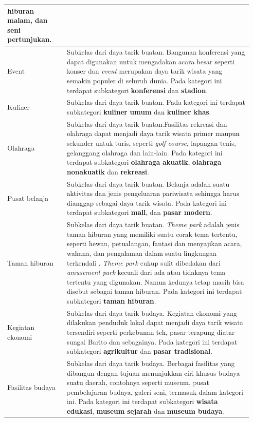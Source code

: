\begin{center}
\begin{longtable}{ |l|m{10cm}| }
	\textbf{hiburan malam}, dan \textbf{seni pertunjukan}. \\
	\hline
	Event & Subkelas dari daya tarik buatan. Bangunan konferensi yang dapat digunakan untuk mengadakan acara besar seperti konser dan \textit{event}
	merupakan daya tarik wisata yang semakin populer di seluruh dunia. Pada kategori ini terdapat subkategori \textbf{konferensi} dan \textbf{stadion}.\\
	\hline
	Kuliner & Subkelas dari daya tarik buatan. Pada kategori ini terdapat subkategori \textbf{kuliner umum} dan \textbf{kuliner khas}.\\
	\hline
	Olahraga & Subkelas dari daya tarik buatan.Fasilitas rekreasi dan olahraga dapat menjadi daya tarik wisata primer maupun sekunder untuk
	turis, seperti \textit{golf course}, lapangan tenis, gelanggang olahraga dan lain-lain.
	Pada kategori ini terdapat subkategori \textbf{olahraga akuatik}, \textbf{olahraga nonakuatik} dan \textbf{rekreasi}.\\
	\hline
	Pusat belanja & Subkelas dari daya tarik buatan. Belanja adalah suatu aktivitas dan jenis pengeluaran pariwisata sehingga harus dianggap sebagai daya tarik wisata.
	Pada kategori ini terdapat subkategori \textbf{mall}, dan \textbf{pasar modern}.\\
	\hline
	Taman hiburan & Subkelas dari daya tarik buatan. \textit{Theme park} adalah jenis taman hiburan yang memiliki suatu corak tema tertentu, seperti
	hewan, petualangan, fantasi dan menyajikan acara, wahana, dan pengalaman dalam suatu lingkungan terkendali \cite{inskeep1991tourism}.
	\textit{Theme park} cukup sulit dibedakan dari \textit{amusement park} kecuali dari ada atau tidaknya tema tertentu yang digunakan. Namun
	kedunya tetap masih bisa disebut sebagai taman hiburan.
	Pada kategori ini terdapat subkategori \textbf{taman hiburan}.\\
	\hline
	Kegiatan ekonomi & Subkelas dari daya tarik budaya. Kegiatan ekonomi yang dilakukan penduduk lokal dapat menjadi daya tarik wisata tersendiri seperti perkebunan teh, 
	pasar terapung diatar sungai Barito dan sebagainya.
	Pada kategori ini terdapat subkategori \textbf{agrikultur} dan \textbf{pasar tradisional}.\\
	\hline
	Fasilitas budaya & Subkelas dari daya tarik budaya. Berbagai fasilitas yang dibangun dengan tujuan menunjukkan ciri khusus budaya suatu daerah,
	contohnya seperti museum, pusat pembelajaran budaya, galeri seni, termasuk dalam kategori ini.
	Pada kategori ini terdapat subkategori \textbf{wisata edukasi}, \textbf{museum sejarah} dan \textbf{museum budaya}.\\

\end{longtable}
\end{center}
